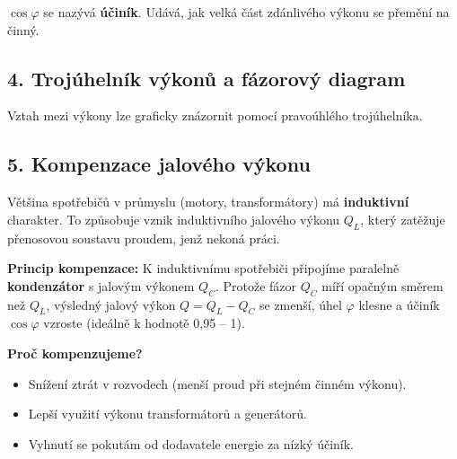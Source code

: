 \documentclass[a4paper,10pt]{article}
\begin{document}
\begin{vysvetlenibox}
$\cos \varphi$ se nazývá \textbf{účiník}. Udává, jak velká část zdánlivého výkonu se přemění na činný.

\subsection*{4. Trojúhelník výkonů a fázorový diagram}

Vztah mezi výkony lze graficky znázornit pomocí pravoúhlého trojúhelníka.

\begin{center}
\end{center}

\subsection*{5. Kompenzace jalového výkonu}

Většina spotřebičů v průmyslu (motory, transformátory) má \textbf{induktivní} charakter. To způsobuje vznik induktivního jalového výkonu $Q_L$, který zatěžuje přenosovou soustavu proudem, jenž nekoná práci.

\textbf{Princip kompenzace:} K induktivnímu spotřebiči připojíme paralelně \textbf{kondenzátor} s jalovým výkonem $Q_C$. Protože fázor $Q_C$ míří opačným směrem než $Q_L$, výsledný jalový výkon $Q = Q_L - Q_C$ se zmenší, úhel $\varphi$ klesne a účiník $\cos \varphi$ vzroste (ideálně k hodnotě 0,95 -- 1).

\begin{durazbox}
\textbf{Proč kompenzujeme?}
\begin{itemize}
  \item Snížení ztrát v rozvodech (menší proud při stejném činném výkonu).
  \item Lepší využití výkonu transformátorů a generátorů.
  \item Vyhnutí se pokutám od dodavatele energie za nízký účiník.
\end{itemize}
\end{durazbox}


\end{vysvetlenibox}
\end{document}
